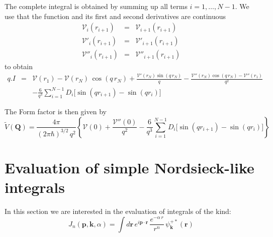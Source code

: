 The complete integral is obtained by summing up all terms $i=1, \ldots,
N-1$. We use that the function and its first and second derivatives are
continuous
\begin{eqnarray*}
\mathcal{V}_{i}(r_{i+1}) &=& \mathcal{V}_{i+1}(r_{i+1})
\\
\mathcal{V}'_{i}(r_{i+1}) &=& \mathcal{V}'_{i+1}(r_{i+1})
\\
\mathcal{V}''_{i}(r_{i+1}) &=& \mathcal{V}''_{i+1}(r_{i+1})
\end{eqnarray*}
%
to obtain
\begin{eqnarray*}
q. I &=& \mathcal{V}(r_{1})  - \mathcal{V}(r_{N})\, \cos (q\,r_{N}) +
\frac{\mathcal{V}'(r_{N}) \sin{(q\,r_{N})}}{q}
-\frac{\mathcal{V}''(r_{N}) \cos{(q\,r_{N})} -
\mathcal{V}''(r_{1})}{q^{2}} \nonumber
\\
&&-  \frac{6}{q^{3}}\sum_{i=1}^{N-1} D_{i} \Big[\sin{ (q r_{i+1})} -
\sin{ (q r_{i})}\Big]
\end{eqnarray*}

The Form factor is then given by
\begin{equation}\label{Q:apspl2}
\tilde{V}(\bm{Q}) =\frac{4 \pi}{(2 \pi \hbar)^{3/2} \, q^2} \left\{
\mathcal{V}(0) + \frac{\mathcal{V}''(0)}{q^{2}} - \frac{6}{q^{3}}
\sum_{i=1}^{N-1} D_{i} \Big[\sin{ (q r_{i+1})} - \sin{ (q r_{i})}\Big]
\right\}
\end{equation}


\section{Evaluation of simple Nordsieck-like integrals}
In this section we are interested in the evaluation of integrals of the kind:
\begin{equation}\label{Q:J-Nords-Numer} 
  J_{n}(\bm{p},\bm{k},\alpha) =
  \int d \bm{r} \, e^{i \bm{p}\cdot\bm{r}} \, \frac{e^{-\alpha \, r}}{r^{n}} \, \psi_{\bm{k}}^{+*}(\bm{r})
\end{equation}

